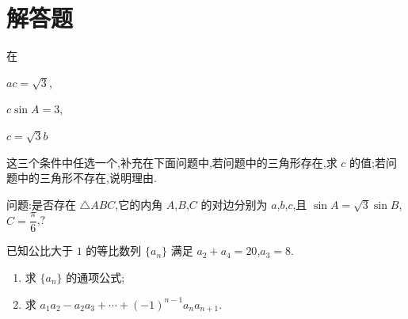 \section{解答题}

\begin{problem}
在
\begin{circlelist}
\item \(ac=\sqrt3\),
\item \(c\sin A=3\),
\item \(c=\sqrt3 b\)
\end{circlelist}
这三个条件中任选一个,补充在下面问题中,若问题中的三角形存在,求 \(c\) 的值;若问题中的三角形不存在,说明理由.

问题:是否存在 \(\triangle ABC\),它的内角 \(A\),\(B\),\(C\) 的对边分别为 \(a\),\(b\),\(c\),且 \(\sin A=\sqrt3\sin B\),\(C=\dfrac{\pi}{6}\),\fillinblank{}?
\end{problem}

\begin{problem}
已知公比大于 \(1\) 的等比数列 \(\{a_n\}\) 满足 \(a_2+a_4=20\),\(a_3=8\).

\begin{enumerate}
\item 求 \(\{a_n\}\) 的通项公式;
\item 求 \(a_1a_2-a_2a_3+\cdots+(-1)^{n-1}a_na_{n+1}\).
\end{enumerate}
\end{problem}

